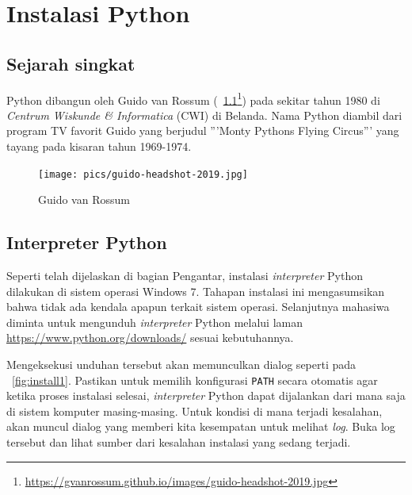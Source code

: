 \chapter{Instalasi Python}
\section{Sejarah singkat}
Python dibangun oleh Guido van Rossum (\figurename~\ref{fig:guido}\footnote{\url{https://gvanrossum.github.io/images/guido-headshot-2019.jpg}}) pada sekitar tahun 1980 di \textit{Centrum Wiskunde \& Informatica} (CWI) di Belanda\cite{python3intro}. Nama Python diambil dari program TV favorit Guido yang berjudul '''Monty Pythons Flying Circus''' yang tayang pada kisaran tahun 1969-1974.

\begin{figure}
  \begin{center}
    \texttt{[image: pics/guido-headshot-2019.jpg]}
    \caption{Guido van Rossum}
    \label{fig:guido}
  \end{center}
\end{figure}

\section{Interpreter Python}
\label{sec:interpreter}
Seperti telah dijelaskan di bagian Pengantar, instalasi \textit{interpreter} Python dilakukan di sistem operasi Windows 7. Tahapan instalasi ini mengasumsikan bahwa tidak ada kendala apapun terkait sistem operasi. Selanjutnya mahasiwa diminta untuk mengunduh \textit{interpreter} Python melalui laman \url{https://www.python.org/downloads/} sesuai kebutuhannya. 

Mengeksekusi unduhan tersebut akan memunculkan dialog seperti pada \figurename~\ref{fig:install1}. Pastikan untuk memilih konfigurasi \texttt{PATH} secara otomatis agar ketika proses instalasi selesai, \textit{interpreter} Python dapat dijalankan dari mana saja di sistem komputer masing-masing. Untuk kondisi di mana terjadi kesalahan, akan muncul dialog yang memberi kita kesempatan untuk melihat \textit{log}. Buka log tersebut dan lihat sumber dari kesalahan instalasi yang sedang terjadi.

